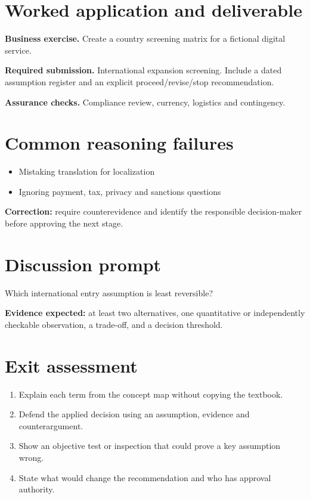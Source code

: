 \documentclass[11pt,letterpaper]{article}
\begin{document}
\section{Worked application and deliverable}
\textbf{Business exercise.} Create a country screening matrix for a fictional digital service.\par\textbf{Required submission.} International expansion screening. Include a dated assumption register and an explicit proceed/revise/stop recommendation.\par\textbf{Assurance checks.} Compliance review, currency, logistics and contingency.
\section{Common reasoning failures}
\begin{itemize}[leftmargin=*,itemsep=3pt]
\item Mistaking translation for localization
\item Ignoring payment, tax, privacy and sanctions questions
\end{itemize}
\noindent\textbf{Correction:} require counterevidence and identify the responsible decision-maker before approving the next stage.
\section{Discussion prompt}
Which international entry assumption is least reversible?\par\medskip\textbf{Evidence expected:} at least two alternatives, one quantitative or independently checkable observation, a trade-off, and a decision threshold.
\section{Exit assessment}
\begin{enumerate}[leftmargin=*,itemsep=5pt]
\item Explain each term from the concept map without copying the textbook.
\item Defend the applied decision using an assumption, evidence and counterargument.
\item Show an objective test or inspection that could prove a key assumption wrong.
\item State what would change the recommendation and who has approval authority.
\end{enumerate}

\end{document}
